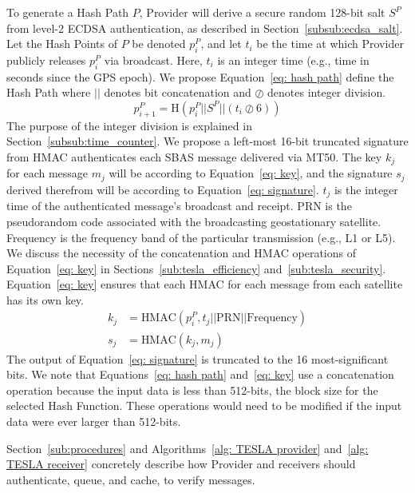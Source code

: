 \documentclass[letterpaper,times]{IONconf/IONconf}
\begin{document}
		To generate a Hash Path $P$, Provider will derive a secure random 128-bit salt $S^P$ from level-2 ECDSA authentication, as described in Section~\ref{subsub:ecdsa_salt}.
		Let the Hash Points of $P$ be denoted $p^P_i$, and let $t_i$ be the time at which Provider publicly releases $p^P_i$ via broadcast.
		Here, $t_i$ is an integer time (e.g., time in seconds since the GPS epoch).
		We propose Equation~\eqref{eq: hash path} define the Hash Path where $||$ denotes bit concatenation and $\oslash$ denotes integer division.
		\begin{equation}
			p^P_{i+1} = \textrm{H} \left(p^P_i || S^P || (t_i \oslash 6) \right) \label{eq: hash path}
		\end{equation}
		The purpose of the integer division is explained in Section~\ref{subsub:time_counter}.
		We propose a left-most 16-bit truncated signature from HMAC authenticates each SBAS message delivered via MT50.
		The key $k_j$ for each message $m_j$ will be according to Equation~\eqref{eq: key}, and the signature $s_j$ derived therefrom will be according to Equation~\eqref{eq: signature}.
		$t_j$ is the integer time of the authenticated message's broadcast and receipt.
		PRN is the pseudorandom code associated with the broadcasting geostationary satellite.
		Frequency is the frequency band of the particular transmission (e.g., L1 or L5).
		We discuss the necessity of the concatenation and HMAC operations of Equation~\eqref{eq: key} in Sections~\ref{sub:tesla_efficiency} and~\ref{sub:tesla_security}.
		Equation~\eqref{eq: key} ensures that each HMAC for each message from each satellite has its own key. 
		\begin{align}
			k_j &= \textrm{HMAC}(p^P_i, t_j || \textrm{PRN} || \textrm{Frequency} \label{eq: key}) \\
			s_j &= \textrm{HMAC}(k_j, m_j) \label{eq: signature}
		\end{align}
		The output of Equation~\eqref{eq: signature} is truncated to the 16 most-significant bits.
		We note that Equations~\eqref{eq: hash path} and~\eqref{eq: key} use a concatenation operation because the input data is less than 512-bits, the block size for the selected Hash Function.
		These operations would need to be modified if the input data were ever larger than 512-bits.

		Section~\ref{sub:procedures} and Algorithms~\ref{alg: TESLA provider} and~\ref{alg: TESLA receiver} concretely describe how Provider and receivers should authenticate, queue, and cache, to verify messages.
\end{document}
